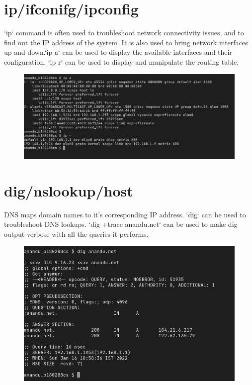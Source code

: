 \documentclass{article}
\begin{document}
\pagebreak
\section{ip/ifconifg/ipconfig}
`ip` command is often used to troubleshoot network connectivity issues, and to find out the IP address of the system. It is also used to bring network interfaces up and down.`ip a` can be used to display the available interfaces and their configuration. `ip r` can be used to display and manipulate the routing table.

\begin{figure}[ht]
    \centering
    \includegraphics[width=1.0\textwidth]{images/ip.png}
\end{figure}
\pagebreak

\section{dig/nslookup/host}
DNS maps domain names to it's corresponding IP address. `dig` can be used to troubleshoot DNS lookups.
`dig +trace anandu.net` can be used to make dig output verbose with all the queries it performs.
\begin{figure}[ht]
    \centering
    \includegraphics[width=1.0\textwidth]{images/dig.png}
\end{figure}
\pagebreak
\end{document}
